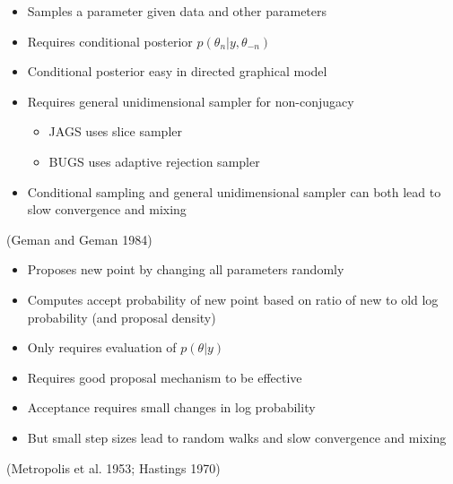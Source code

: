 \documentclass[10pt]{report}
\newcommand{\sld}[1]{\newpage{\noindent\LARGE \ \ \
    \textcolor{MidnightBlue}{\bfseries #1}}\vspace*{4pt}}
\begin{document}
\sld{Gibbs Sampling}
\begin{itemize}
\item Samples a parameter given data and other parameters
\item Requires conditional posterior $p(\theta_n|y,\theta_{-n})$
\item Conditional posterior easy in directed graphical model
\item Requires general unidimensional sampler for non-conjugacy

\begin{itemize}
\item JAGS uses slice sampler
\item BUGS uses adaptive rejection sampler
\end{itemize}
\item Conditional sampling and general unidimensional sampler 
can both lead to slow convergence and mixing
\end{itemize}
\vfill\hfill
{\small (Geman and Geman 1984)}

\sld{Metropolis-Hastings Sampling}
\begin{itemize}
\item Proposes new point by changing all parameters randomly
\item Computes accept probability of new point based
on ratio of new to old log probability (and proposal density)
\item Only requires evaluation of $p(\theta|y)$
\item Requires good proposal mechanism to be effective
\item Acceptance requires small changes in log probability
\item But small step sizes lead to random walks and slow convergence
  and mixing
\end{itemize}
\vfill\hfill
{\small (Metropolis et al. 1953; Hastings 1970)}
\end{document}
